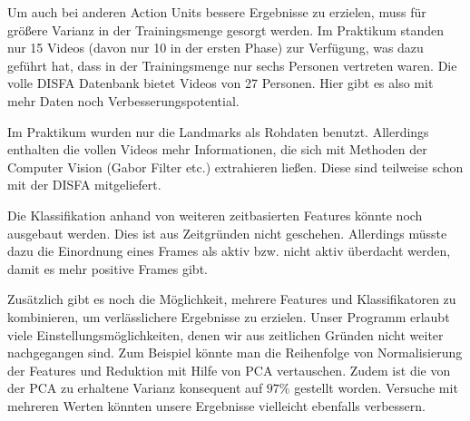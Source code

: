 Um auch bei anderen Action Units bessere Ergebnisse zu erzielen, muss für
größere Varianz in der Trainingsmenge gesorgt werden. Im Praktikum standen nur
15 Videos (davon nur 10 in der ersten Phase) zur Verfügung, was dazu geführt
hat, dass in der Trainingsmenge nur sechs Personen vertreten waren. Die volle
DISFA Datenbank bietet Videos von 27 Personen. Hier gibt es also mit mehr Daten
noch Verbesserungspotential.

Im Praktikum wurden nur die Landmarks als Rohdaten benutzt. Allerdings enthalten
die vollen Videos mehr Informationen, die sich mit Methoden der Computer Vision
(Gabor Filter etc.) extrahieren ließen. Diese sind teilweise schon mit der DISFA mitgeliefert.

Die Klassifikation anhand von weiteren zeitbasierten Features könnte noch ausgebaut
werden. Dies ist aus Zeitgründen nicht geschehen. Allerdings müsste dazu die
Einordnung eines Frames als aktiv bzw. nicht aktiv überdacht werden, damit es
mehr positive Frames gibt.

Zusätzlich gibt es noch die Möglichkeit, mehrere Features und Klassifikatoren zu
kombinieren, um verlässlichere Ergebnisse zu erzielen. Unser Programm erlaubt viele Einstellungsmöglichkeiten, denen wir aus zeitlichen Gründen nicht
weiter nachgegangen sind. Zum Beispiel könnte man die Reihenfolge von
Normalisierung der Features und Reduktion mit Hilfe von PCA vertauschen. Zudem
ist die von der PCA zu erhaltene Varianz konsequent auf $97\%$ gestellt worden. Versuche mit mehreren Werten könnten unsere Ergebnisse vielleicht ebenfalls verbessern.


